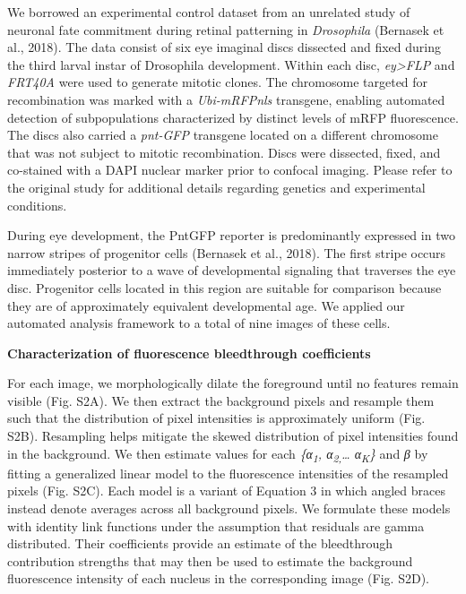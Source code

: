 We borrowed an experimental control dataset from an unrelated study of neuronal fate commitment during retinal patterning in \emph{Drosophila} (Bernasek et al., 2018). The data consist of six eye imaginal discs dissected and fixed during the third larval instar of Drosophila development. Within each disc, \emph{ey\textgreater{}FLP} and \emph{FRT40A} were used to generate mitotic clones. The chromosome targeted for recombination was marked with a \emph{Ubi-mRFPnls} transgene, enabling automated detection of subpopulations characterized by distinct levels of mRFP fluorescence. The discs also carried a \emph{pnt-GFP} transgene located on a different chromosome that was not subject to mitotic recombination. Discs were dissected, fixed, and co-stained with a DAPI nuclear marker prior to confocal imaging. Please refer to the original study for additional details regarding genetics and experimental conditions.

During eye development, the PntGFP reporter is predominantly expressed in two narrow stripes of progenitor cells (Bernasek et al., 2018). The first stripe occurs immediately posterior to a wave of developmental signaling that traverses the eye disc. Progenitor cells located in this region are suitable for comparison because they are of approximately equivalent developmental age. We applied our automated analysis framework to a total of nine images of these cells.

\textbf{Characterization of fluorescence bleedthrough coefficients}

For each image, we morphologically dilate the foreground until no features remain visible (Fig. S2A). We then extract the background pixels and resample them such that the distribution of pixel intensities is approximately uniform (Fig. S2B). Resampling helps mitigate the skewed distribution of pixel intensities found in the background. We then estimate values for each \emph{\{α\textsubscript{1}, α\textsubscript{2,}\ldots{} α\textsubscript{K}\}} and \emph{β} by fitting a generalized linear model to the fluorescence intensities of the resampled pixels (Fig. S2C). Each model is a variant of Equation 3 in which angled braces instead denote averages across all background pixels. We formulate these models with identity link functions under the assumption that residuals are gamma distributed. Their coefficients provide an estimate of the bleedthrough contribution strengths that may then be used to estimate the background fluorescence intensity of each nucleus in the corresponding image (Fig. S2D).

